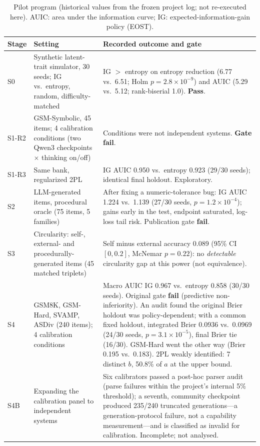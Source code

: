 \begin{table}[htbp]
\centering\footnotesize
\caption{Pilot program (historical values from the frozen project log; not re-executed here).
AUIC: area under the information curve; IG: expected-information-gain policy (EOST).}
\label{tab:pilot}
\setlength{\tabcolsep}{4pt}
\begin{tabular}{@{}p{0.9cm}p{4.2cm}p{9.4cm}@{}}
\toprule
Stage & Setting & Recorded outcome and gate \\
\midrule
S0 & Synthetic latent-trait simulator, 30 seeds; IG vs.\ entropy, random, difficulty-matched &
IG $>$ entropy on entropy reduction (6.77 vs.\ 6.51; Holm $p=2.8\times10^{-9}$) and AUIC (5.29 vs.\ 5.12; rank-biserial 1.0). \textbf{Pass}. \\
S1-R2 & GSM-Symbolic, 45 items; 4 calibration conditions (two Qwen3 checkpoints $\times$ thinking on/off) &
Conditions were not independent systems. \textbf{Gate fail}. \\
S1-R3 & Same bank, regularized 2PL & IG AUIC 0.950 vs.\ entropy 0.923 (29/30 seeds); identical final holdout. Exploratory. \\
S2 & LLM-generated items, procedural oracle (75 items, 5 families) &
After fixing a numeric-tolerance bug: IG AUIC 1.224 vs.\ 1.139 (27/30 seeds, $p=1.2\times10^{-4}$); gains early in the test, endpoint saturated, log-loss tail risk. Publication gate \textbf{fail}. \\
S3 & Circularity: self-, external- and procedurally-generated items (45 matched triplets) &
Self minus external accuracy 0.089 (95\% CI $[0,0.2]$, McNemar $p=0.22$): no \emph{detectable} circularity gap at this power (not equivalence). \\
S4 & GSM8K, GSM-Hard, SVAMP, ASDiv (240 items); 4 calibration conditions &
Macro AUIC IG 0.967 vs.\ entropy 0.858 (30/30 seeds). Original gate \textbf{fail} (predictive non-inferiority). An audit found the original Brier holdout was policy-dependent; with a common fixed holdout, integrated Brier 0.0936 vs.\ 0.0969 (24/30 seeds, $p=3.1\times10^{-5}$), final Brier tie (16/30). GSM-Hard went the other way (Brier 0.195 vs.\ 0.183). 2PL weakly identified: 7 distinct $b$, 50.8\% of $a$ at the upper bound. \\
S4B & Expanding the calibration panel to independent systems &
Six calibrators passed a post-hoc parser audit (parse failures within the project's internal 5\% threshold); a seventh, community checkpoint produced 235/240 truncated generations---a generation-protocol failure, not a capability measurement---and is classified as invalid for calibration. Incomplete; not analysed. \\
\bottomrule
\end{tabular}
\end{table}

